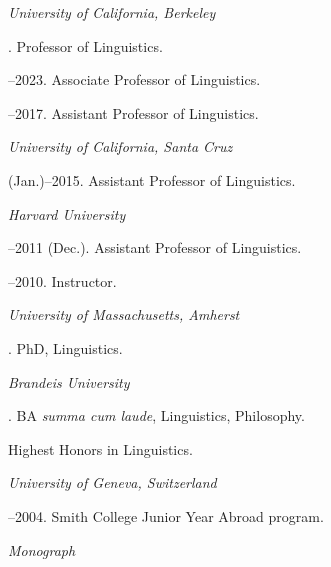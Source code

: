 \documentclass[12pt]{article}
\begin{document}
\noindent\emph{University of California, Berkeley \vspace{0.01in}}

.  Professor of Linguistics.


--2023. Associate Professor of Linguistics.



--2017. Assistant Professor of Linguistics. 

\medskip

\noindent\emph{University of California, Santa Cruz \vspace{0.01in}}

 (Jan.)--2015. Assistant Professor of Linguistics. 


\medskip
\noindent\emph{Harvard University \vspace{0.01in}}

--2011 (Dec.). Assistant Professor of Linguistics.

--2010. Instructor. 

\bigskip



\noindent\emph{University of Massachusetts, Amherst \vspace{0.01in}}

. PhD, Linguistics. 




\medskip
\noindent\emph{Brandeis University\vspace{0.02in}}

. BA \emph{summa cum laude}, Linguistics, Philosophy.  

Highest Honors in Linguistics.


\medskip
\noindent\emph{University of Geneva, Switzerland\vspace{0.02in}}

--2004. Smith College Junior Year Abroad program.  




\bigskip
 
\medskip
\noindent\emph{Monograph }%
 

\renewcommand*\labelenumi{[\theenumi]}
\end{document}

